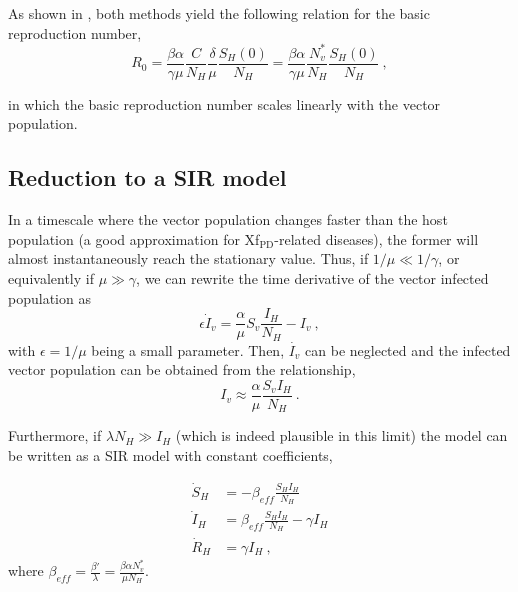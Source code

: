 As shown in \cite{GimenezRomero2022_PRE}, both methods yield the following
relation for the basic reproduction number,
\begin{equation}
    R_0 = \frac{\beta \alpha}{\gamma
        \mu}\frac{C}{N_H}\frac{\delta}{\mu}\frac{S_H(0)}{N_H}=\frac{\beta
        \alpha}{\gamma \mu}\frac{N_v^*}{N_H}\frac{S_H(0)}{N_H}\ ,
\end{equation}

in which the basic reproduction number scales linearly with the vector
population.

\subsection{Reduction to a SIR model}

In a timescale where the vector population changes faster than the host
population (a good approximation for Xf$_{\textrm{PD}}$-related diseases), the
former will almost instantaneously reach the stationary value. Thus, if
$1/\mu\ll1/\gamma$, or equivalently if $\mu\gg\gamma$, we can rewrite the time
derivative of the vector infected population as
\begin{equation}
    \epsilon\dot{I}_v=\frac{\alpha}{\mu}S_v\frac{I_H}{N_H} - I_v \ ,
\end{equation}
with $\epsilon=1/\mu$ being a small parameter. Then, $\dot{I_v}$ can be
neglected and the infected vector population can be obtained from the
relationship,
\begin{equation}\label{eq:Iv_timescale_approx}
    I_v\approx\frac{\alpha}{\mu}\frac{S_v I_H}{N_H} \ .
\end{equation}

Furthermore, if $\lambda N_H \gg I_H$ (which is indeed plausible in this
limit) the model can be written as a SIR model with constant coefficients,

\begin{equation}\label{eq:SIR}
    \begin{aligned}
        \dot{S}_H & =-\beta_{eff}\frac{S_HI_H}{N_H}            \\
        \dot{I}_H & =\beta_{eff}\frac{S_HI_H}{N_H}- \gamma I_H \\
        \dot{R}_H & =\gamma I_H \ ,
    \end{aligned}
\end{equation}
where $\displaystyle\beta_{eff}=\frac{\beta'}{\lambda}=\frac{\beta\alpha
        N_v^*}{\mu N_H}$.\\

